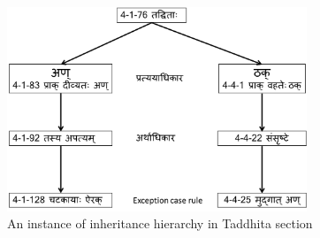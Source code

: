 \documentclass[11pt]{article}
\begin{document}
\begin{figure}[h]
    \centering
	\includegraphics[width=0.8\textwidth]{tad}
    \caption{An instance of inheritance hierarchy in Taddhita section}
    \label{fig:inheritance}
\end{figure}
\end{document}
